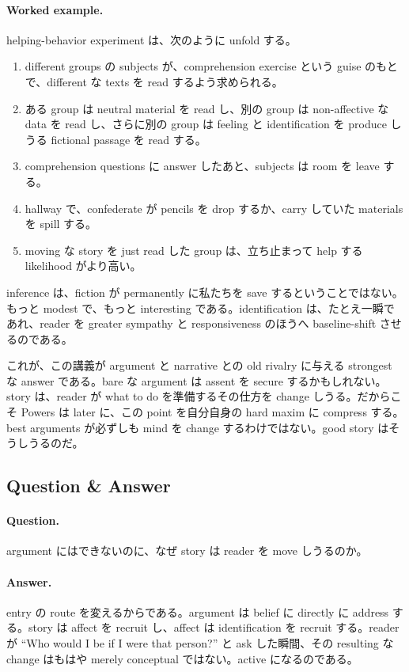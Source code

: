 \paragraph{Worked example.} helping-behavior experiment は、次のように unfold する。
\begin{enumerate}
\item different groups の subjects が、comprehension exercise という guise のもとで、different な texts を read するよう求められる。
\item ある group は neutral material を read し、別の group は non-affective な data を read し、さらに別の group は feeling と identification を produce しうる fictional passage を read する。
\item comprehension questions に answer したあと、subjects は room を leave する。
\item hallway で、confederate が pencils を drop するか、carry していた materials を spill する。
\item moving な story を just read した group は、立ち止まって help する likelihood がより高い。
\end{enumerate}
inference は、fiction が permanently に私たちを save するということではない。もっと modest で、もっと interesting である。identification は、たとえ一瞬であれ、reader を greater sympathy と responsiveness のほうへ baseline-shift させるのである。

これが、この講義が argument と narrative との old rivalry に与える strongest な answer である。bare な argument は assent を secure するかもしれない。story は、reader が what to do を準備するその仕方を change しうる。だからこそ Powers は later に、この point を自分自身の hard maxim に compress する。best arguments が必ずしも mind を change するわけではない。good story はそうしうるのだ。

\subsection{Question \& Answer}

\paragraph{Question.} argument にはできないのに、なぜ story は reader を move しうるのか。

\paragraph{Answer.} entry の route を変えるからである。argument は belief に directly に address する。story は affect を recruit し、affect は identification を recruit する。reader が ``Who would I be if I were that person?'' と ask した瞬間、その resulting な change はもはや merely conceptual ではない。active になるのである。

